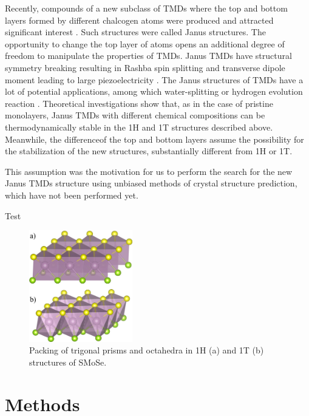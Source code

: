 \documentclass[a4paperm]{article}
\begin{document}
Recently, compounds of a new subclass of TMDs where the top and bottom layers formed by different chalcogen atoms were produced and attracted significant interest \cite{lu2017, zhang2017janus}. 
Such structures were called Janus structures.
The opportunity to change the top layer of atoms opens an additional degree of freedom to manipulate the properties of TMDs. 
Janus TMDs have structural symmetry breaking \cite{li2017electronic, van2020first} resulting in Rashba spin splitting \cite{hu2018intrinsic} and transverse dipole moment leading to large piezoelectricity \cite{dong2017large, li2018recent}. 
The Janus structures of TMDs have a lot of potential applications, among which water-splitting \cite{xia2018universality, ma2018janus} or hydrogen evolution reaction \cite{er2018prediction, zhou2019janus}. 
Theoretical investigations show that, as in the case of pristine monolayers, Janus TMDs with different chemical compositions can be thermodynamically stable in the 1H and 1T structures described above.
Meanwhile, the differenceof the top and bottom layers assume the possibility for the stabilization of the new structures, substantially different from 1H or 1T.

This assumption was the motivation for us to perform the search for the new Janus TMDs structure using unbiased methods of crystal structure prediction, which have not been performed yet.

Test 


\begin{figure}
        \includegraphics[width=0.4\textwidth]{1H1T.png}
        \caption{Packing of trigonal prisms and octahedra in 1H (a) and 1T (b) structures of SMoSe.}
\label{1H1T}
\end{figure}





		\section{Methods}
\end{document}
